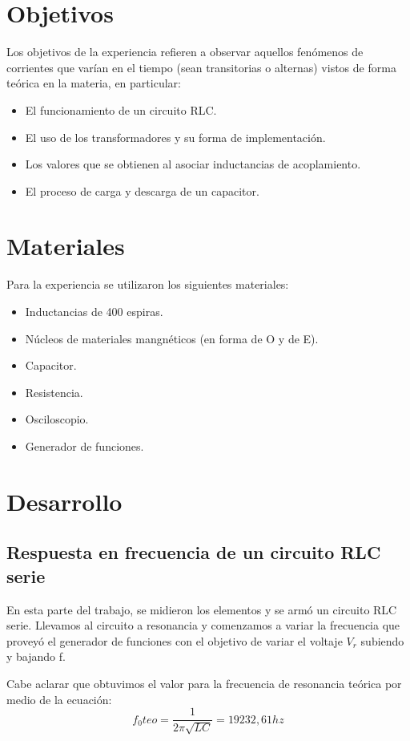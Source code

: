 \documentclass{article}
\begin{document}
\section{Objetivos}
Los objetivos de la experiencia refieren a observar aquellos fenómenos de corrientes que varían en el tiempo (sean transitorias o alternas) vistos de forma teórica en la materia, en particular:
    \begin{itemize}
		\item El funcionamiento de un circuito RLC.
		\item El uso de los transformadores y su forma de implementación.
		\item Los valores que se obtienen al asociar inductancias de acoplamiento.
		\item El proceso de carga y descarga de un capacitor.
	\end{itemize}

\section{Materiales}
	Para la experiencia se utilizaron los siguientes materiales:
    \begin{itemize}
		\item Inductancias de 400 espiras.
		\item Núcleos de materiales mangnéticos (en forma de O y de E).
		\item Capacitor.
		\item Resistencia.
		\item Osciloscopio.
		\item Generador de funciones.
	\end{itemize}

\section{Desarrollo}

\subsection{Respuesta en frecuencia de un circuito RLC serie}

En esta parte del trabajo, se midieron los elementos y se armó un circuito RLC serie. Llevamos al circuito a resonancia y comenzamos a variar la frecuencia que proveyó el generador de funciones con el objetivo de variar el voltaje $V_r$ subiendo y bajando f. 

Cabe aclarar que obtuvimos el valor para la frecuencia de resonancia teórica por medio de la ecuación:
\begin{equation}
f_0teo = \frac{1}{2 \pi \sqrt{LC}} = 19232,61 hz
\end{equation}
\end{document}
